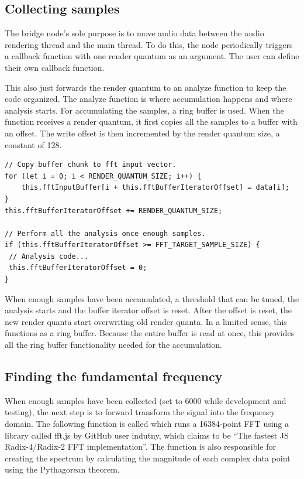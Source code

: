 \subsection{Collecting samples}
The bridge node's sole purpose is to move audio data between the audio rendering thread and the main thread. To do this, the node periodically triggers a callback function with one render quantum as an argument. The user can define their own callback function.



This also just forwards the render quantum to an analyze function to keep the code organized. The analyze function is where accumulation happens and where analysis starts. For accumulating the samples, a ring buffer is used. When the function receives a render quantum, it first copies all the samples to a buffer with an offset. The write offset is then incremented by the render quantum size, a constant of 128.

\begin{lstlisting}[style=javascript, caption={Smaller chunks of samples are aggregated for the 16384-point FFT using a modified ring buffer.}]
// Copy buffer chunk to fft input vector.
for (let i = 0; i < RENDER_QUANTUM_SIZE; i++) {
    this.fftInputBuffer[i + this.fftBufferIteratorOffset] = data[i];
}
this.fftBufferIteratorOffset += RENDER_QUANTUM_SIZE;

// Perform all the analysis once enough samples.
if (this.fftBufferIteratorOffset >= FFT_TARGET_SAMPLE_SIZE) {
 // Analysis code...
 this.fftBufferIteratorOffset = 0;
}
\end{lstlisting}
When enough samples have been accumulated, a threshold that can be tuned, the analysis starts and the buffer iterator offset is reset. After the offset is reset, the new render quanta start overwriting old render quanta. In a limited sense, this functions as a ring buffer. Because the entire buffer is read at once, this provides all the ring buffer functionality needed for the accumulation. 

\subsection{Finding the fundamental frequency}
When enough samples have been collected (set to 6000 while development and testing), the next step is to forward transform the signal into the frequency domain. The following function is called which runs a 16384-point FFT using a library called fft.js by GitHub user indutny, which claims to be “The fastest JS Radix-4/Radix-2 FFT implementation”. The function is also responsible for creating the spectrum by calculating the magnitude of each complex data point using the Pythagorean theorem. 


